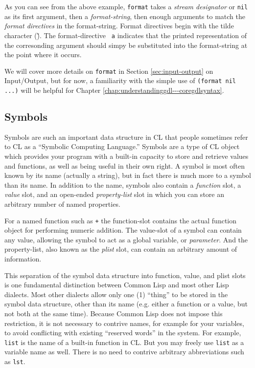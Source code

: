 \documentclass [11pt]{book}
\begin{document}
As you can see from the above example, \texttt{format} takes a \emph{stream designator} or \texttt{nil} as its first argument, then a \emph{format-string}, then enough arguments to match the \emph{format directives} in the format-string. Format directives begin with the
tilde character (\~).  The format-directive \texttt{~a} indicates that the printed representation of the corresonding argument should simpy be 
substituted into the format-string at the point where it occurs.



We will cover more details on \texttt{format} in Section 
\ref{sec:input-output} on Input/Output, but for now, a familiarity with the simple use of \texttt{(format nil ...)} will be helpful for Chapter 
\ref{chap:understandinggdl---coregdlsyntax}.



\subsection{Symbols}

\label{subsec:symbols}



Symbols are such an important data structure in CL that people
sometimes refer to CL as a ``Symbolic Computing Language.'' Symbols
are a type of CL object which provides your program with a built-in
capacity to store and retrieve values and functions, as well as being
useful in their own right. A symbol is most often known by its name
 (actually a string), but in fact there is much more to a symbol than
its name. In addition to the name, symbols also contain a \emph{function} slot, a \emph{value} slot, and an open-ended \emph{property-list} slot in which you can store an arbitrary number of named properties.



For a named function such as \texttt{+} the function-slot contains the actual function
object for performing numeric addition. The value-slot of a symbol can
contain any value, allowing the symbol to act as a global variable, or \emph{parameter}. And the property-list, also known as the \emph{plist} slot, can contain an arbitrary amount of information.



This separation of the symbol data structure into function, value, and
plist slots is one fundamental distinction between Common Lisp and most
other Lisp dialects. Most other dialects allow only one (1) ``thing''
to be stored in the symbol data structure, other than its name
 (e.g. either a function or a value, but not both at the same
time). Because Common Lisp does not impose this restriction, it is not
necessary to contrive names, for example for your variables, to avoid
conflicting with existing ``reserved words'' in the system. For
example, \texttt{list} is the name of a built-in function in CL. But you
may freely use \texttt{list} as a variable name as well. There is no need to
contrive arbitrary abbreviations such as \texttt{lst}.
\end{document}
